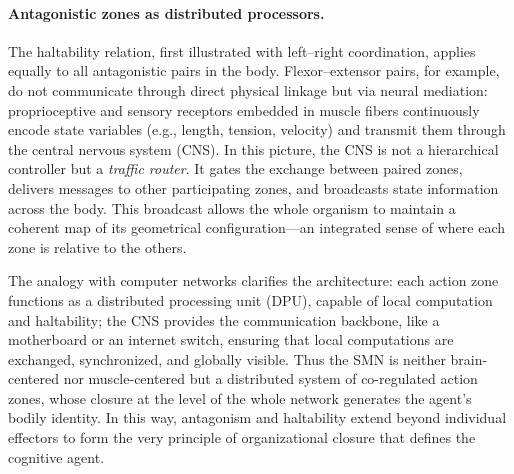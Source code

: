 \paragraph{Antagonistic zones as distributed processors.}
The haltability relation, first illustrated with left–right coordination, applies equally to all antagonistic pairs in the body. 
Flexor–extensor pairs, for example, do not communicate through direct physical linkage but via neural mediation: proprioceptive and sensory receptors embedded in muscle fibers continuously encode state variables (e.g., length, tension, velocity) and transmit them through the central nervous system (CNS). 
In this picture, the CNS is not a hierarchical controller but a \emph{traffic router}. 
It gates the exchange between paired zones, delivers messages to other participating zones, and broadcasts state information across the body. 
This broadcast allows the whole organism to maintain a coherent map of its geometrical configuration—an integrated sense of where each zone is relative to the others.

The analogy with computer networks clarifies the architecture: each action zone functions as a distributed processing unit (DPU), capable of local computation and haltability; the CNS provides the communication backbone, like a motherboard or an internet switch, ensuring that local computations are exchanged, synchronized, and globally visible. 
Thus the SMN is neither brain-centered nor muscle-centered but a distributed system of co-regulated action zones, whose closure at the level of the whole network generates the agent’s bodily identity. 
In this way, antagonism and haltability extend beyond individual effectors to form the very principle of organizational closure that defines the cognitive agent.

